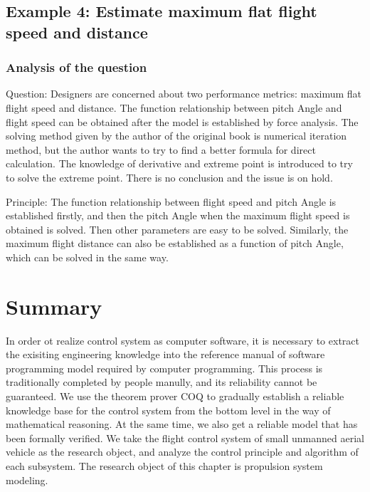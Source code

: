 \documentclass{article} %
\numberwithin{equation}{section} %
\begin{document}
\newpage

\subsection{Example 4: Estimate maximum flat flight speed and distance}

\subsubsection{Analysis of the question}

Question: Designers are concerned about two performance metrics: maximum flat flight speed and distance.
The function relationship between pitch Angle and flight speed can be obtained after the model is established by force analysis.
The solving method given by the author of the original book is numerical iteration method, but the author wants to try to find a better formula for direct calculation.
The knowledge of derivative and extreme point is introduced to try to solve the extreme point.
There is no conclusion and the issue is on hold.

Principle: The function relationship between flight speed and pitch Angle is established firstly, and then the pitch Angle when the maximum flight speed is obtained is solved. Then other parameters are easy to be solved.
Similarly, the maximum flight distance can also be established as a function of pitch Angle, which can be solved in the same way.


\newpage


\section{Summary}

In order ot realize control system as computer software, it is necessary to extract the exisiting engineering knowledge into the reference manual of software programming model required by computer programming.
This process is traditionally completed by people manully, and its reliability cannot be guaranteed.
We use the theorem prover COQ to gradually establish a reliable knowledge base for the control system from the bottom level in the way of mathematical reasoning.
At the same time, we also get a reliable model that has been formally verified.
We take the flight control system of small unmanned aerial vehicle as the research object, and analyze the control principle and algorithm of each subsystem.
The research object of this chapter is propulsion system modeling.
\end{document}
